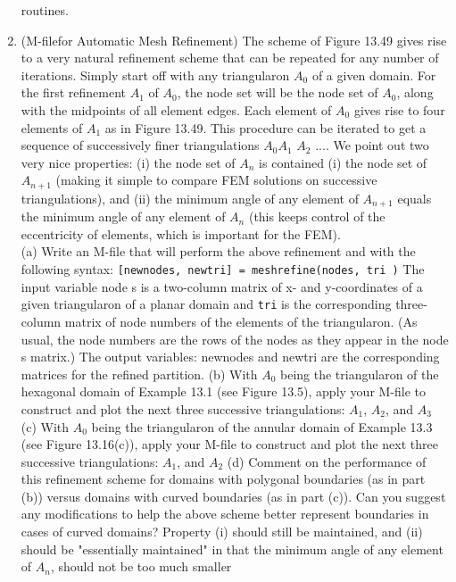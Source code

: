 \documentclass[../main.tex]{subfiles}
\begin{document}
\begin{enumerate}
routines. 
	\item (M-filefor Automatic Mesh Refinement) The scheme of Figure 13.49 gives rise to a very natural 
refinement scheme that can be repeated for any number of iterations. Simply start off with any 
triangularon \textit{$A_{0}$} of a given domain. For the first refinement \textit{$A_{1}$} of \textit{$A_{0}$}, the node set will 
be the node set of \textit{$A_{0}$}, along with the midpoints of all element edges. Each element of 
\textit{$A_{0}$} gives rise to four elements of \textit{$A_{1}$} as in Figure 13.49. This procedure can be iterated to 
get a sequence of successively finer triangulations \textit{$A_{0}$}\textit{$A_{1}$} \textit{$A_2$} .... We point out two very 
nice properties: (i) the node set of \textit{$A_{n}$} is contained (i) the node set of \textit{$A_{n+1}$} (making it simple 
to compare FEM solutions on successive triangulations), and (ii) the minimum angle of any 
element of \textit{$A_{n+1}$} equals the minimum angle of any element of \textit{$A_n$} (this keeps control of the 
eccentricity of elements, which is important for the FEM). \\
(a) Write an M-file that will perform the above refinement and with the following syntax: 
\texttt{[newnodes, newtri] = meshrefine(nodes, tri )} 
The input variable node s is a two-column matrix of x- and y-coordinates of a given 
triangularon of a planar domain and \texttt{tri} is the corresponding three-column matrix of node 
numbers of the elements of the triangularon. (As usual, the node numbers are the rows of the 
nodes as they appear in the node s matrix.) The output variables: newnodes and newtri 
are the corresponding matrices for the refined partition. 
(b) With \textit{$A_0$} being the triangularon of the hexagonal domain of Example 13.1 (see Figure 
13.5), apply your M-file to construct and plot the next three successive triangulations: \textit{$A_1$}, 
\textit{$A_2$}, and \textit{$A_3$} 
(c) With \textit{$A_0$} being the triangularon of the annular domain of Example 13.3 (see Figure 
13.16(c)), apply your M-file to construct and plot the next three successive triangulations: 
\textit{$A_1$}, and \textit{$A_2$} 
(d) Comment on the performance of this refinement scheme for domains with polygonal 
boundaries (as in part (b)) versus domains with curved boundaries (as in part (c)). Can you 
suggest any modifications to help the above scheme better represent boundaries in cases of 
curved domains? Property (i) should still be maintained, and (ii) should be "essentially 
maintained" in that the minimum angle of any element of \textit{$A_n$}, should not be too much smaller 

\end{enumerate}
\end{document}
